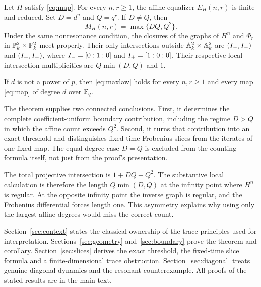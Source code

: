 \begin{theorem}\label{thm:main}
Let $H$ satisfy \eqref{eq:map}. For every $n,r\geq1$, the affine equalizer
$E_H(n,r)$ is finite and reduced. Set $D=d^n$ and $Q=q^r$. If $D\ne Q$,
then
\begin{equation}\label{eq:maxlaw}
 \boxed{M_H(n,r)=\max\{DQ,Q^2\}.}
\end{equation}
Under the same nonresonance condition, the closures of the graphs of $H^n$ and $\Phi_r$ in
$\mathbb P^2_k\times\mathbb P^2_k$ meet properly. Their only intersections outside
$\mathbb A^2_k\times\mathbb A^2_k$ are
$(I_{-},I_{-})$ and $(I_{+},I_{+})$, where
$I_{-}=[0:1:0]$ and $I_{+}=[1:0:0]$. Their respective local intersection
multiplicities are $Q\min(D,Q)$ and $1$.
\end{theorem}

\begin{corollary}\label{cor:allclocks}
If $d$ is not a power of $p$, then \eqref{eq:maxlaw} holds for every
$n,r\geq1$ and every map \eqref{eq:map} of degree $d$ over $\mathbb F_q$.
\end{corollary}

The theorem supplies two connected conclusions. First, it determines the
complete coefficient-uniform boundary contribution, including the regime
$D>Q$ in which the affine count exceeds $Q^2$. Second, it turns that
contribution into an exact threshold and distinguishes fixed-time
Frobenius slices from the iterates of one fixed map. The equal-degree
case $D=Q$ is excluded from the counting formula itself, not just from
the proof's presentation.

The total projective intersection is $1+DQ+Q^2$. The substantive local
calculation is therefore the length $Q\min(D,Q)$ at the infinity point
where $H^n$ is regular. At the opposite infinity point the inverse graph
is regular, and the Frobenius differential forces length one. This
asymmetry explains why using only the largest affine degrees would miss
the correct count.

Section~\ref{sec:context} states the classical ownership of the trace
principles used for interpretation. Sections~\ref{sec:geometry}
and~\ref{sec:boundary} prove the theorem and corollary.
Section~\ref{sec:slices} derives the exact threshold, the fixed-time
slice formula and a finite-dimensional trace obstruction.
Section~\ref{sec:diagonal} treats genuine diagonal dynamics and the
resonant counterexample. All proofs of the stated results are in the
main text.
